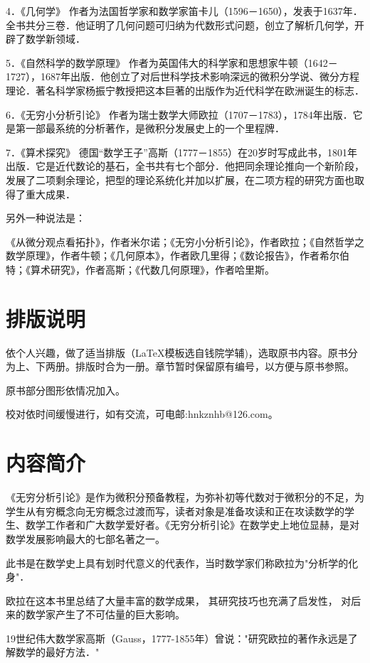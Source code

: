4．《几何学》 作者为法国哲学家和数学家笛卡儿（1596－1650），发表于1637年．全书共分三卷．他证明了几何问题可归纳为代数形式问题，创立了解析几何学，开辟了数学新领域．

5．《自然科学的数学原理》 作者为英国伟大的科学家和思想家牛顿（1642－1727），1687年出版．他创立了对后世科学技术影响深远的微积分学说、微分方程理论．著名科学家杨振宁教授把这本巨著的出版作为近代科学在欧洲诞生的标志．

6．《无穷小分析引论》 作者为瑞士数学大师欧拉（1707－1783），1784年出版．它是第一部最系统的分析著作，是微积分发展史上的一个里程牌．

7．《算术探究》 德国“数学王子”高斯（1777－1855）在20岁时写成此书，1801年出版．它是近代数论的基石，全书共有七个部分．他把同余理论推向一个新阶段，发展了二项剩余理论，把型的理论系统化并加以扩展，在二项方程的研究方面也取得了重大成果．

另外一种说法是：

《从微分观点看拓扑》，作者米尔诺；《无穷小分析引论》，作者欧拉；《自然哲学之数学原理》，作者牛顿；《几何原本》，作者欧几里得；《数论报告》，作者希尔伯特；《算术研究》，作者高斯；《代数几何原理》，作者哈里斯。

\section*{排版说明}
依个人兴趣，做了适当排版（\LaTeX 模板选自钱院学辅)，选取原书内容。原书分为上、下两册。排版时合为一册。章节暂时保留原有编号，以方便与原书参照。

原书部分图形依情况加入。

校对依时间缓慢进行，如有交流，可电邮:hnkznhb@126.com。

\section*{内容简介}
《无穷分析引论》是作为微积分预备教程，为弥补初等代数对于微积分的不足，为学生从有穷概念向无穷概念过渡而写，读者对象是准备攻读和正在攻读数学的学生、数学工作者和广大数学爱好者。《无穷分析引论》在数学史上地位显赫，是对数学发展影响最大的七部名著之一。

此书是在数学史上具有划时代意义的代表作，当时数学家们称欧拉为"分析学的化身"．

欧拉在这本书里总结了大量丰富的数学成果， 其研究技巧也充满了启发性， 对后来的数学家产生了不可估量的巨大影响。

19世纪伟大数学家高斯（Gauss，1777-1855年）曾说："研究欧拉的著作永远是了解数学的最好方法．"

